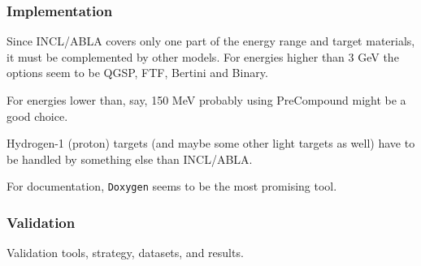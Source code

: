 \begin{appendix}
\subsubsection{Implementation}
Since INCL/ABLA covers only one part of the energy range and target
materials, it must be complemented by other models. For energies higher
than 3 GeV the options seem to be QGSP, FTF, Bertini and Binary.

For energies lower than, say, 150 MeV probably using PreCompound might
be a good choice.

Hydrogen-1 (proton) targets (and maybe some other light targets as
well) have to be handled by something else than INCL/ABLA.

For documentation, {\tt Doxygen} seems to be the most promising tool.

\subsubsection{Validation}

Validation tools, strategy, datasets, and results.






\end{appendix}
